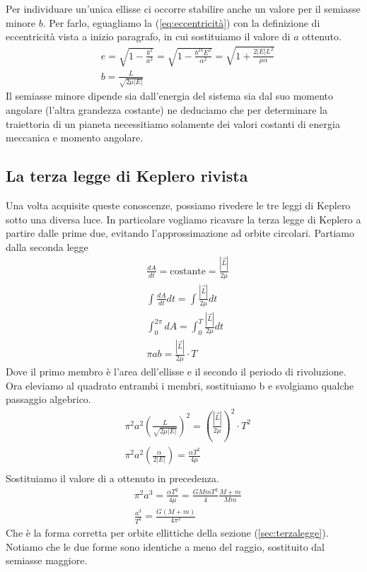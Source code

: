 Per individuare un'unica ellisse ci occorre stabilire anche un valore per il semiasse minore $b$.
Per farlo, eguagliamo la (\ref{eq:eccentricità}) con la definizione di eccentricità vista a inizio paragrafo, in cui sostituiamo il valore di $a$ ottenuto.
\begin{align*}
	&e = \sqrt{1-\frac{b^2}{a^2}} = \sqrt{1-\frac{b^24E^2}{\alpha^2}} = \sqrt{1+\frac{2|E|L^2}{\mu\alpha}}\\
	&b = \frac{L}{\sqrt{2\mu|E|}}
\end{align*}
Il semiasse minore dipende sia dall'energia del sistema sia dal suo momento angolare (l'altra grandezza costante) ne deduciamo che per determinare la traiettoria di un pianeta necessitiamo solamente dei valori costanti di energia meccanica e momento angolare. 
\subsection{La terza legge di Keplero rivista}\label{sec:terzaleggerivista}
Una volta acquisite queste conoscenze, possiamo rivedere le tre leggi di Keplero sotto una diversa luce. In particolare vogliamo ricavare la terza legge di Keplero a partire dalle prime due, evitando l'approssimazione ad orbite circolari. Partiamo dalla seconda legge
\begin{align*}
	&\frac{dA}{dt} = \text{costante} = \frac{|\vec{L}|}{2\mu}\\
	&\int\frac{dA}{dt}dt = \int\frac{|\vec{L}|}{2\mu}dt\\
	&\int_0^{2\pi} dA = \int_0^T\frac{|\vec{L}|}{2\mu}dt\\
	&\pi a b = \frac{|\vec{L}|}{2\mu} \cdot T
\end{align*}
Dove il primo membro è l'area dell'ellisse e il secondo il periodo di rivoluzione.\\
Ora eleviamo al quadrato entrambi i membri, sostituiamo b e svolgiamo qualche passaggio algebrico.
\begin{align*}
	&\pi^2 a^2 (\frac{L}{\sqrt{2\mu |E|}})^2  = (\frac{|\vec{L}|}{2\mu})^2 \cdot T^2\\
	&\pi^2 a^2(\frac{\alpha}{2|E|})=\frac{\alpha T^2}{4 \mu}\\
\end{align*}
Sostituiamo il valore di a ottenuto in precedenza. 
\begin{align*}
	&\pi^2 a^3=\frac{\alpha T^2}{4\mu} = \frac{GMm T^2}{4}\frac{M+m}{Mm}\\
	&\frac{a^3}{T^2}=\frac{G(M+m)}{4\pi^2}
\end{align*}
Che è la forma corretta per orbite ellittiche della sezione (\ref{sec:terzalegge}). Notiamo che le due forme sono identiche a meno del raggio, sostituito dal semiasse maggiore.
